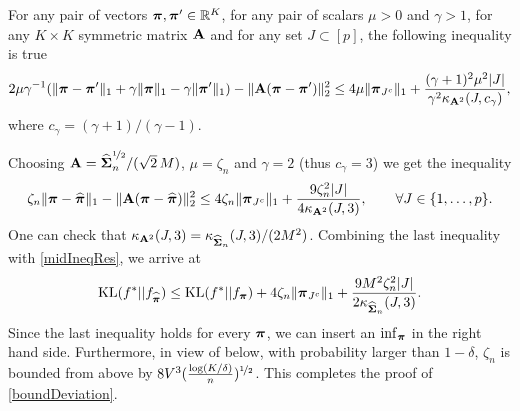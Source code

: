 \begin{lemma}
	For any pair of vectors $\boldsymbol \pi,\boldsymbol \pi'\in{\mathbb R}^K$, for any pair of scalars $\mu>0$ and $\gamma>1$, for any $K\times K$
	symmetric matrix $\mathbf A$ and for any set $J \subset [p]$, the following inequality is true
	\begin{equation}
	2\mu\gamma^{-1}(\| \boldsymbol \pi-\boldsymbol \pi'\|_1 + \gamma \|\boldsymbol \pi\|_1 - \gamma \|\boldsymbol \pi'\|_1 )-\|\mathbf A(\boldsymbol \pi-\boldsymbol \pi')\|_2^2 \leq
	4\mu \| \boldsymbol \pi_{J^c}\|_1 + \frac{(\gamma+1)^2\mu^2|J|}{\gamma^2\kappa_{\mathbf A^2}(J,c_{\gamma})},
	\end{equation}
	where $c_{\gamma}=(\gamma+1)/(\gamma-1)$.
\end{lemma}


Choosing $\mathbf A = \widehat{\boldsymbol\Sigma}_n^{\nicefrac12}/(\sqrt{2}\,M)$, $\mu=\zeta_n$ and $\gamma=2$ (thus $c_\gamma = 3$)
we get the inequality
\begin{equation}
\zeta_n\| \boldsymbol \pi-\widehat{\boldsymbol \pi}\|_1-\|\mathbf A(\boldsymbol \pi-\widehat{\boldsymbol \pi})\|_2^2 \leq
4\zeta_n\| \boldsymbol \pi_{J^c}\|_1 + \frac{9\zeta_n^2|J|}{4\kappa_{\mathbf A^2}(J,3)},\qquad \forall J \in \{1, \dots, p\}.
\end{equation}
One can check that $\kappa_{\mathbf A^2}(J,3) = \kappa_{\widehat{\boldsymbol\Sigma}_n}(J,3)/(2M^2)$.
Combining the last inequality with \eqref{midIneqRes}, we arrive at
\begin{equation}
\label{oracleIneqTh}
{\rm KL}(f^*|| f_{\widehat{\boldsymbol \pi}}) \leq {\rm KL}(f^*|| f_{\boldsymbol \pi}) + 4\zeta_n\| \boldsymbol \pi_{J^c}\|_1 + \frac{9M^2\zeta_n^2|J|}{2\kappa_{\widehat{\boldsymbol\Sigma}_n}(J,3)}.
\end{equation}
Since the last inequality holds for every $\boldsymbol \pi$, we can insert an $\inf_{\boldsymbol \pi}$ in the right hand side.
Furthermore, in view of  below, with probability larger than $1-\delta$, $\zeta_n$ is bounded from above
by $8V^3(\frac{\log(K/\delta)}{n})^{\nicefrac12}$. This completes the proof of \eqref{boundDeviation}.

